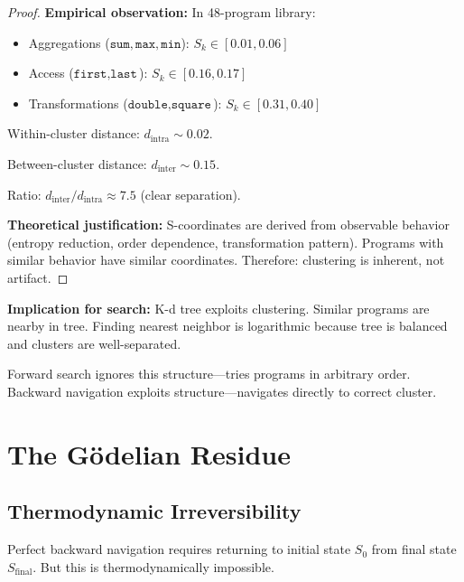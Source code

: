 \documentclass[twocolumn,10pt]{article}
\theoremstyle{definition}
\theoremstyle{remark}
\newcommand{\Sk}{S_k}
\begin{document}
\begin{proof}
\textbf{Empirical observation:} In 48-program library:

\begin{itemize}
\item Aggregations ($\texttt{sum}, \texttt{max}, \texttt{min}$): $\Sk \in [0.01, 0.06]$
\item Access ($\texttt{first}, \texttt{last}$): $\Sk \in [0.16, 0.17]$
\item Transformations ($\texttt{double}, \texttt{square}$): $\Sk \in [0.31, 0.40]$
\end{itemize}

Within-cluster distance: $d_{\text{intra}} \sim 0.02$.

Between-cluster distance: $d_{\text{inter}} \sim 0.15$.

Ratio: $d_{\text{inter}}/d_{\text{intra}} \approx 7.5$ (clear separation).

\vspace{0.2cm}
\noindent\textbf{Theoretical justification:} S-coordinates are derived from observable behavior (entropy reduction, order dependence, transformation pattern). Programs with similar behavior have similar coordinates. Therefore: clustering is inherent, not artifact.
\end{proof}

\vspace{0.2cm}
\noindent\textbf{Implication for search:} K-d tree exploits clustering. Similar programs are nearby in tree. Finding nearest neighbor is logarithmic because tree is balanced and clusters are well-separated.

\vspace{0.2cm}
\noindent Forward search ignores this structure—tries programs in arbitrary order. Backward navigation exploits structure—navigates directly to correct cluster.

\section{The Gödelian Residue}
\label{sec:residue}

\subsection{Thermodynamic Irreversibility}

Perfect backward navigation requires returning to initial state $S_0$ from final state $S_{\text{final}}$. But this is thermodynamically impossible.
\end{document}
